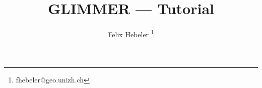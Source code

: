 \newcommand{\dir}{tut}

\pagestyle{myheadings} 


\title{GLIMMER {\glimmerver} --- Tutorial}
\author{Felix Hebeler \thanks{fhebeler@geo.unizh.ch}}
\maketitle
\tableofcontents
\newpage



